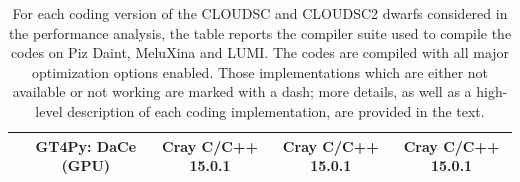 \documentclass[gmd,manuscript,online]{copernicus}
\begin{document}
\begin{table}[t!]
\begin{footnotesize}
\begin{tabular}{|c|c|c|c|c|}
				& GT4Py: DaCe (GPU) & Cray C/C++ 15.0.1 & Cray C/C++ 15.0.1 & Cray C/C++ 15.0.1 \\
				\hline
			\end{tabular}
		\end{footnotesize}
		\vspace*{0.2cm}
		\caption{For each coding version of the CLOUDSC and CLOUDSC2 dwarfs considered in the performance analysis, the table reports the compiler suite used to compile the codes on Piz Daint, MeluXina and LUMI. The codes are compiled with all major optimization options enabled. Those implementations which are either not available or not working are marked with a dash; more details, as well as a high-level description of each coding implementation, are provided in the text.}
		\label{tab:compiler}
	\end{table}
\end{document}

